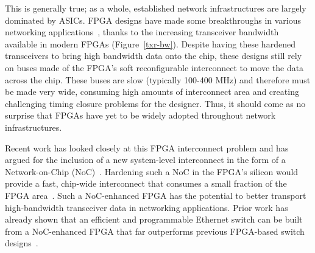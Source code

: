 This is generally true; as a whole, established network infrastructures are largely dominated by ASICs.
FPGA designs have made some breakthroughs in various networking applications~\cite{attig2011400,byma2014fpgas,zhou2015packet,muhlbach2010malcobox}, thanks to the increasing transceiver bandwidth available in modern FPGAs (Figure~\ref{txr-bw}).
Despite having these hardened transceivers to bring high bandwidth data onto the chip, these designs still rely on buses made of the FPGA's soft reconfigurable interconnect to move the data across the chip.
These buses are slow (typically 100-400 MHz) and therefore must be made very wide, consuming high amounts of interconnect area and creating challenging timing closure problems for the designer.
Thus, it should come as no surprise that FPGAs have yet to be widely adopted throughout network infrastructures.

%
%
%
%

%
%
%
%

Recent work has looked closely at this FPGA interconnect problem and has argued for the inclusion of a new system-level interconnect in the form of a Network-on-Chip (NoC)~\cite{abdelfattah2015take}.
Hardening such a NoC in the FPGA's silicon would provide a fast, chip-wide interconnect that consumes a small fraction of the FPGA area~\cite{abdelfattah2015take}.
Such a NoC-enhanced FPGA has the potential to better transport high-bandwidth transceiver data in networking applications.
Prior work has already shown that an efficient and programmable Ethernet switch can be built from a NoC-enhanced FPGA that far outperforms previous FPGA-based switch designs~\cite{bitar2014efficient}.

